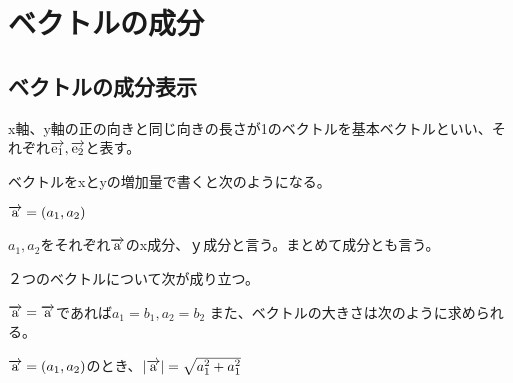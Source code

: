 \documentclass[a4paper]{jsarticle}
\newcommand{\abs}[1]{\lvert #1 \rvert}
\newcommand{\bekutoru}[1]{\overrightarrow{\rm #1}}
\begin{document}




\section*{ベクトルの成分}
\subsection*{ベクトルの成分表示}
x軸、y軸の正の向きと同じ向きの長さが1のベクトルを基本ベクトルといい、それぞれ$\bekutoru{e_1}, \bekutoru{e_2}$と表す。\par
ベクトルをxとyの増加量で書くと次のようになる。\par
$\bekutoru{a}=(a_1, a_2)$\par
$a_1, a_2$をそれぞれ$\bekutoru{a}$のx成分、ｙ成分と言う。まとめて成分とも言う。\par
２つのベクトルについて次が成り立つ。\par
$\bekutoru{a}=\bekutoru{a}$であれば$a_1=b_1, a_2=b_2$
また、ベクトルの大きさは次のように求められる。\par
\begin{screen}
  $\bekutoru{a}=(a_1, a_2)$のとき、$\abs{\bekutoru{a}}=\sqrt{a^2_1+a^2_1}$
\end{screen}
\end{document}
